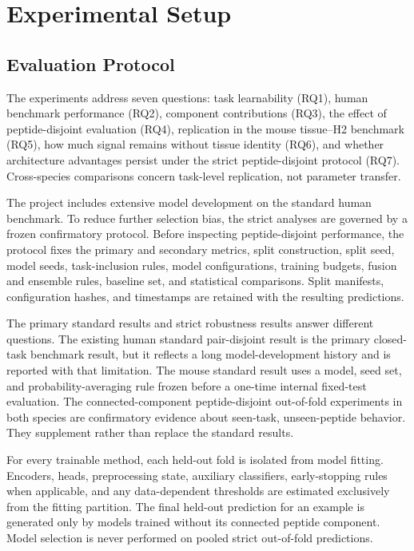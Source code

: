 \section{Experimental Setup}

\subsection{Evaluation Protocol}

The experiments address seven questions: task learnability (RQ1), human benchmark performance (RQ2), component contributions (RQ3), the effect of peptide-disjoint evaluation (RQ4), replication in the mouse tissue--H2 benchmark (RQ5), how much signal remains without tissue identity (RQ6), and whether architecture advantages persist under the strict peptide-disjoint protocol (RQ7). Cross-species comparisons concern task-level replication, not parameter transfer.

The project includes extensive model development on the standard human benchmark. To reduce further selection bias, the strict analyses are governed by a frozen confirmatory protocol. Before inspecting peptide-disjoint performance, the protocol fixes the primary and secondary metrics, split construction, split seed, model seeds, task-inclusion rules, model configurations, training budgets, fusion and ensemble rules, baseline set, and statistical comparisons. Split manifests, configuration hashes, and timestamps are retained with the resulting predictions.

The primary standard results and strict robustness results answer different questions. The existing human standard pair-disjoint result is the primary closed-task benchmark result, but it reflects a long model-development history and is reported with that limitation. The mouse standard result uses a model, seed set, and probability-averaging rule frozen before a one-time internal fixed-test evaluation. The connected-component peptide-disjoint out-of-fold experiments in both species are confirmatory evidence about seen-task, unseen-peptide behavior. They supplement rather than replace the standard results.

For every trainable method, each held-out fold is isolated from model fitting. Encoders, heads, preprocessing state, auxiliary classifiers, early-stopping rules when applicable, and any data-dependent thresholds are estimated exclusively from the fitting partition. The final held-out prediction for an example is generated only by models trained without its connected peptide component. Model selection is never performed on pooled strict out-of-fold predictions.

